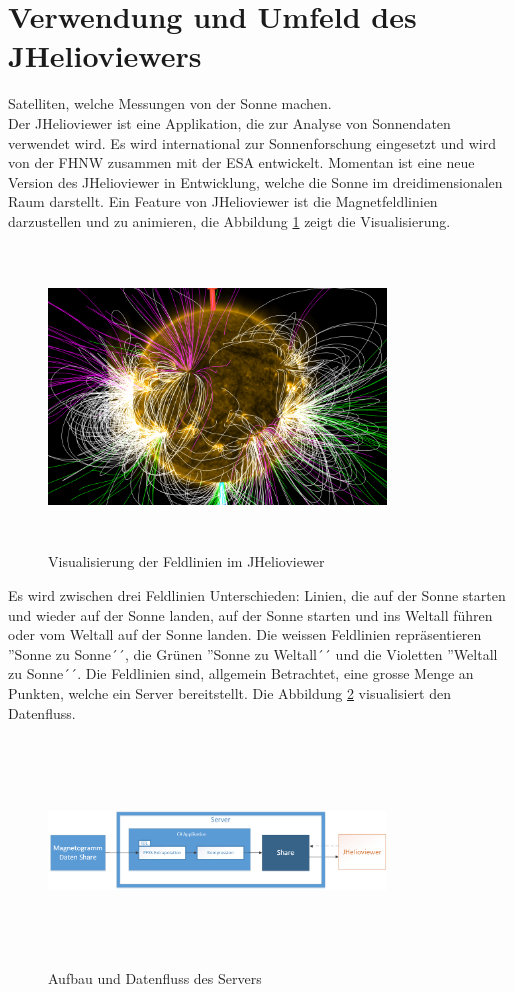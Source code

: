\section{Verwendung und Umfeld des JHelioviewers}
Satelliten, welche Messungen von der Sonne machen.\\
[\baselineskip]
Der JHelioviewer ist eine Applikation, die zur Analyse von Sonnendaten verwendet wird. Es wird international zur Sonnenforschung eingesetzt und wird von der FHNW zusammen mit der ESA entwickelt. Momentan ist eine neue Version des JHelioviewer in Entwicklung, welche die Sonne im dreidimensionalen Raum darstellt. Ein Feature von JHelioviewer ist die Magnetfeldlinien darzustellen und zu animieren, die Abbildung \ref{einleitung::feldlinien} zeigt die Visualisierung.
\begin{figure}[!htbp]
\center
	\includegraphics[width=0.8\textwidth,height=8cm,keepaspectratio]{./pictures/einleitung/fieldLines.png}
	\caption{Visualisierung der Feldlinien im JHelioviewer}
	\label{einleitung::feldlinien}
\end{figure}
Es wird zwischen drei Feldlinien Unterschieden: Linien, die auf der Sonne starten und wieder auf der Sonne landen, auf der Sonne starten und ins Weltall führen oder vom Weltall auf der Sonne landen. Die weissen Feldlinien repräsentieren ''Sonne zu Sonne´´, die Grünen ''Sonne zu Weltall´´ und die Violetten ''Weltall zu Sonne´´. Die Feldlinien sind, allgemein Betrachtet, eine grosse Menge an Punkten, welche ein Server bereitstellt. Die Abbildung \ref{einleitung::aufbau} visualisiert den Datenfluss.
\begin{figure}[!htbp]
\center
	\includegraphics[width=0.8\textwidth,height=6cm,keepaspectratio]{./pictures/einleitung/server.png}
	\caption{Aufbau und Datenfluss des Servers}
	\label{einleitung::aufbau}
\end{figure}

